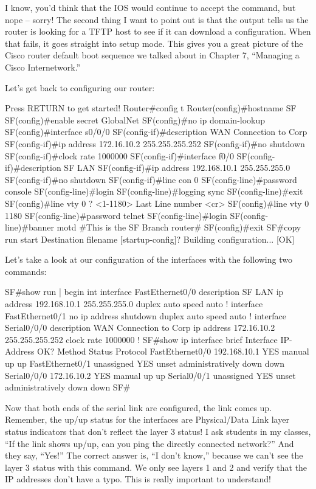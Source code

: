 I know, you'd think that the IOS would continue to accept the command,
but nope -- sorry! The second thing I want to point out is that the
output tells us the router is looking for a TFTP host to see if it can
download a configuration. When that fails, it goes straight into setup
mode. This gives you a great picture of the Cisco router default boot
sequence we talked about in Chapter 7, ``Managing a Cisco
Internetwork.''

Let's get back to configuring our router:

\begin{cli}
Press RETURN to get started!
Router#config t
Router(config)#hostname SF
SF(config)#enable secret GlobalNet
SF(config)#no ip domain-lookup
SF(config)#interface s0/0/0
SF(config-if)#description WAN Connection to Corp
SF(config-if)#ip address 172.16.10.2 255.255.255.252
SF(config-if)#no shutdown
SF(config-if)#clock rate 1000000
SF(config-if)#interface f0/0
SF(config-if)#description SF LAN
SF(config-if)#ip address 192.168.10.1 255.255.255.0
SF(config-if)#no shutdown
SF(config-if)#line con 0
SF(config-line)#password console
SF(config-line)#login
SF(config-line)#logging sync
SF(config-line)#exit
SF(config)#line vty 0 ?
  <1-1180>  Last Line number
  <cr>
SF(config)#line vty 0 1180
SF(config-line)#password telnet
SF(config-line)#login
SF(config-line)#banner motd #This is the SF Branch router#
SF(config)#exit
SF#copy run start
Destination filename [startup-config]?
Building configuration...
 [OK]
\end{cli}

Let's take a look at our configuration of the interfaces with the
following two commands:

\begin{cli}
SF#show run | begin int
interface FastEthernet0/0
 description SF LAN
 ip address 192.168.10.1 255.255.255.0
 duplex auto
 speed auto
!
interface FastEthernet0/1
 no ip address
 shutdown
 duplex auto
 speed auto
!
interface Serial0/0/0
 description WAN Connection to Corp
 ip address 172.16.10.2 255.255.255.252
 clock rate 1000000
!
SF#show ip interface brief
Interface        IP-Address    OK? Method Status                Protocol
FastEthernet0/0  192.168.10.1  YES manual up                    up
FastEthernet0/1  unassigned    YES unset  administratively down down
Serial0/0/0      172.16.10.2   YES manual up                    up
Serial0/0/1      unassigned    YES unset  administratively down down
SF#
\end{cli}

Now that both ends of the serial link are configured, the link comes up.
Remember, the up/up status for the interfaces are Physical/Data Link
layer status indicators that don't reflect the layer 3 status! I ask
students in my classes, ``If the link shows up/up, can you ping the
directly connected network?'' And they say, ``Yes!'' The correct answer
is, ``I don't know,'' because we can't see the layer 3 status with this
command. We only see layers 1 and 2 and verify that the IP addresses
don't have a typo. This is really important to understand!

